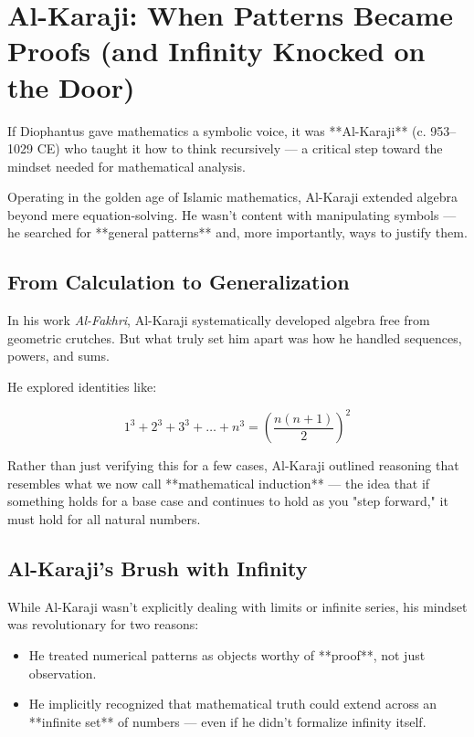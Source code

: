 \section{Al-Karaji: When Patterns Became Proofs (and Infinity Knocked on the Door)}

If Diophantus gave mathematics a symbolic voice, it was **Al-Karaji** (c. 953–1029 CE) who taught it how to think recursively — a critical step toward the mindset needed for mathematical analysis.

Operating in the golden age of Islamic mathematics, Al-Karaji extended algebra beyond mere equation-solving. He wasn’t content with manipulating symbols — he searched for **general patterns** and, more importantly, ways to justify them. 

\subsection{From Calculation to Generalization}

In his work \textit{Al-Fakhri}, Al-Karaji systematically developed algebra free from geometric crutches. But what truly set him apart was how he handled sequences, powers, and sums.

He explored identities like:

\[
1^3 + 2^3 + 3^3 + \dots + n^3 = \left( \frac{n(n+1)}{2} \right)^2
\]

Rather than just verifying this for a few cases, Al-Karaji outlined reasoning that resembles what we now call **mathematical induction** — the idea that if something holds for a base case and continues to hold as you "step forward," it must hold for all natural numbers.

\subsection{Al-Karaji’s Brush with Infinity}

While Al-Karaji wasn’t explicitly dealing with limits or infinite series, his mindset was revolutionary for two reasons:

\begin{itemize}
  \item He treated numerical patterns as objects worthy of **proof**, not just observation.
  \item He implicitly recognized that mathematical truth could extend across an **infinite set** of numbers — even if he didn’t formalize infinity itself.
\end{itemize}


